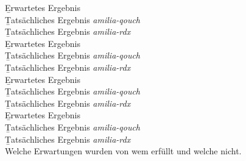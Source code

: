 %
\b{Erwartetes Ergebnis}\\
\b{Tatsächliches Ergebnis \it{amilia-qouch}}\\
\b{Tatsächliches Ergebnis \it{amilia-rdx}}\\
%
\b{Erwartetes Ergebnis}\\
\b{Tatsächliches Ergebnis \it{amilia-qouch}}\\
\b{Tatsächliches Ergebnis \it{amilia-rdx}}\\
%
\b{Erwartetes Ergebnis}\\
\b{Tatsächliches Ergebnis \it{amilia-qouch}}\\
\b{Tatsächliches Ergebnis \it{amilia-rdx}}\\
%
\b{Erwartetes Ergebnis}\\
\b{Tatsächliches Ergebnis \it{amilia-qouch}}\\
\b{Tatsächliches Ergebnis \it{amilia-rdx}}\\
% 
% 
% 
% 
Welche Erwartungen wurden von wem erfüllt und welche nicht.
